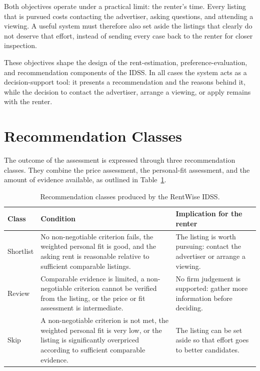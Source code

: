 \documentclass[12pt,a4paper]{report}
\begin{document}
Both objectives operate under a practical limit: the renter's time. Every
listing that is pursued costs contacting the advertiser, asking questions,
and attending a viewing. A useful system must therefore also set aside the
listings that clearly do not deserve that effort, instead of sending every
case back to the renter for closer inspection.

These objectives shape the design of the rent-estimation,
preference-evaluation, and recommendation components of the IDSS. In all
cases the system acts as a decision-support tool: it presents a
recommendation and the reasons behind it, while the decision to contact the
advertiser, arrange a viewing, or apply remains with the renter.

\section{Recommendation Classes}

The outcome of the assessment is expressed through three recommendation
classes. They combine the price assessment, the personal-fit assessment, and
the amount of evidence available, as outlined in Table~\ref{tab:recommendation-classes}.

\begin{table}[H]
\centering
\caption{Recommendation classes produced by the RentWise IDSS.}
\label{tab:recommendation-classes}
\begin{tabularx}{\textwidth}{p{2.2cm} X X}
\toprule
\textbf{Class} & \textbf{Condition} & \textbf{Implication for the renter}\\
\midrule
Shortlist &
No non-negotiable criterion fails, the weighted personal fit is good, and
the asking rent is reasonable relative to sufficient comparable
listings. &
The listing is worth pursuing: contact the advertiser or arrange a
viewing.\\
\addlinespace
Review &
Comparable evidence is limited, a non-negotiable criterion cannot be
verified from the listing, or the price or fit assessment is intermediate. &
No firm judgement is supported: gather more information before deciding.\\
\addlinespace
Skip &
A non-negotiable criterion is not met, the weighted personal fit is very
low, or the listing is significantly overpriced according to sufficient
comparable evidence. &
The listing can be set aside so that effort goes to better candidates.\\
\bottomrule
\end{tabularx}
\end{table}
\end{document}
